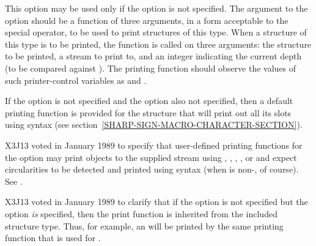 \begin{flushdesc}
\item[\cd{:print-function}]
This option may be used only if the 
option is not specified.
The argument to the  option
should be a function of three arguments,
in a form acceptable to the  special operator,
to be used to print structures of this type.
When a structure of this type is to be printed, the function
is called on three arguments:
the structure to be printed, a stream to print to,
and an integer indicating the current depth (to be compared against
).
The printing function should observe the values of
such printer-control variables as 
and .

If the  option is not specified and the 
option also not specified, then a default printing function is
provided for the structure that will print out all its slots
using  syntax (see section~\ref{SHARP-SIGN-MACRO-CHARACTER-SECTION}).

\begin{new}
X3J13 voted in January 1989
to specify that user-defined printing functions for the 
 option may print objects to the
supplied stream using , , , ,
or  and expect circularities to be detected and printed
using  syntax (when  is non-, of course).
See .
\end{new}


\begin{new}
X3J13 voted in January 1989
to clarify that if the 
option is not specified but the  option \emph{is} specified,
then the print function is inherited from the included structure type.
Thus, for example, an  will be printed by the same
printing function that is used for .


\end{new}
\end{flushdesc}
